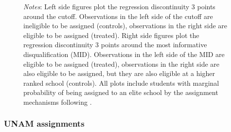 \documentclass[oneside,11pt]{article}
\begin{document}
\begin{figure}[H]
\footnotesize
\textit{Notes}: Left side figures plot the regression discontinuity 3 points around the cutoff. Observations in the left side of the cutoff are ineligible to be assigned (controls), observations in the right side are eligible to be assigned (treated). Right side figures plot the regression discontinuity 3 points around the most informative disqualification (MID). Observations in the left side of the MID are eligible to be assigned (treated), observations in the right side are also eligible to be assigned, but they are also eligible at a higher ranked school (controls). All plots include students with marginal probability of being assigned to an elite school by the assignment mechanisms following \citet{abdulkadirouglu2022breaking}. 
\end{figure}

\subsubsection{UNAM assignments}
\end{document}
